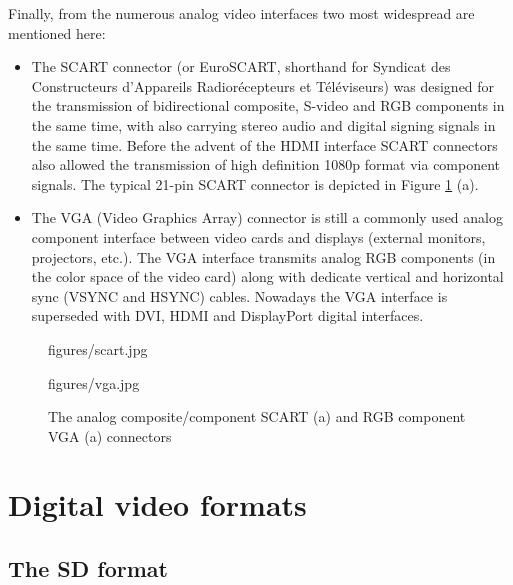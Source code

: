 \hspace{3mm}
Finally, from the numerous analog video interfaces two most widespread are mentioned here:
\begin{itemize}
\item The SCART connector (or EuroSCART, shorthand for Syndicat des Constructeurs d'Appareils Radiorécepteurs et Téléviseurs) was designed for the transmission of bidirectional composite, S-video and RGB components in the same time, with also carrying stereo audio and digital signing signals in the same time.
Before the advent of the HDMI interface SCART connectors also allowed the transmission of high definition 1080p format via \ypbpr component signals.
The typical 21-pin SCART connector is depicted in Figure \ref{Fig:scart_vga} (a).
\item The VGA (Video Graphics Array) connector is still a commonly used analog component interface between video cards and displays (external monitors, projectors, etc.).
The VGA interface transmits analog RGB components (in the color space of the video card) along with dedicate vertical and horizontal sync (VSYNC and HSYNC) cables.
Nowadays the VGA interface is superseded with DVI, HDMI and DisplayPort digital interfaces.
\end{itemize}

\begin{figure}[]
	\centering
	\begin{minipage}[c]{0.63\textwidth}
	\begin{overpic}[width = 0.47\columnwidth ]{figures/scart.jpg}
	\end{overpic} \hfill
		\begin{overpic}[width = 0.4\columnwidth ]{figures/vga.jpg}
	\end{overpic} \end{minipage}\hfill
	\begin{minipage}[c]{0.35\textwidth}
	\caption{The analog composite/component SCART (a) and RGB component VGA (a) connectors}
	\label{Fig:scart_vga}  \end{minipage}
\end{figure}

\section{Digital video formats}
	
\subsection{The SD format}


